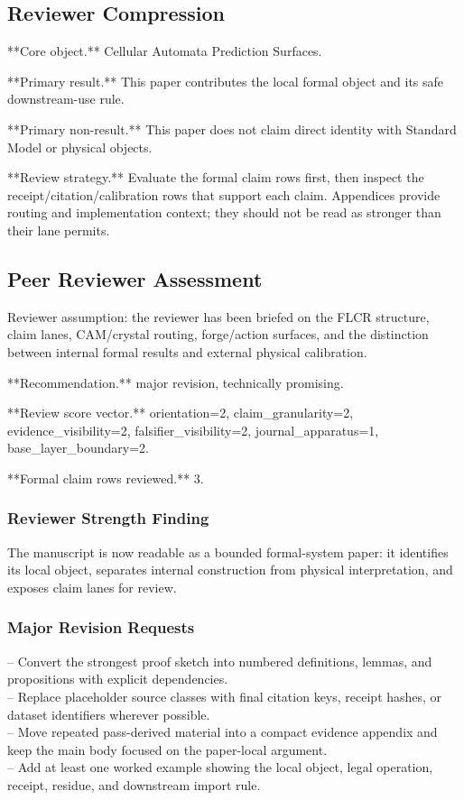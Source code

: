 \documentclass[11pt]{article}
\begin{document}
\subsection*{Reviewer Compression}

**Core object.** Cellular Automata Prediction Surfaces.

**Primary result.** This paper contributes the local formal object and its safe downstream-use rule.

**Primary non-result.** This paper does not claim direct identity with Standard Model or physical objects.

**Review strategy.** Evaluate the formal claim rows first, then inspect the receipt/citation/calibration rows that support each claim. Appendices provide routing and implementation context; they should not be read as stronger than their lane permits.

\subsection*{Peer Reviewer Assessment}

Reviewer assumption: the reviewer has been briefed on the FLCR structure, claim lanes, CAM/crystal routing, forge/action surfaces, and the distinction between internal formal results and external physical calibration.

**Recommendation.** major revision, technically promising.

**Review score vector.** orientation=2, claim\_granularity=2, evidence\_visibility=2, falsifier\_visibility=2, journal\_apparatus=1, base\_layer\_boundary=2.

**Formal claim rows reviewed.** 3.

\subsubsection*{Reviewer Strength Finding}

The manuscript is now readable as a bounded formal-system paper: it identifies its local object, separates internal construction from physical interpretation, and exposes claim lanes for review.

\subsubsection*{Major Revision Requests}

\noindent{}-- Convert the strongest proof sketch into numbered definitions, lemmas, and propositions with explicit dependencies.\\
\noindent{}-- Replace placeholder source classes with final citation keys, receipt hashes, or dataset identifiers wherever possible.\\
\noindent{}-- Move repeated pass-derived material into a compact evidence appendix and keep the main body focused on the paper-local argument.\\
\noindent{}-- Add at least one worked example showing the local object, legal operation, receipt, residue, and downstream import rule.\\
\end{document}
